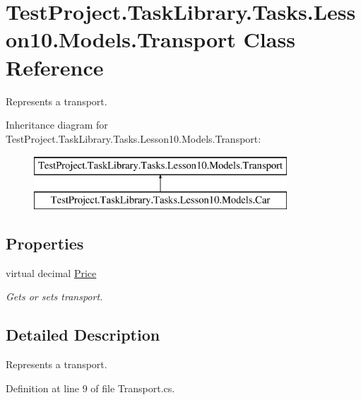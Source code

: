 \hypertarget{class_test_project_1_1_task_library_1_1_tasks_1_1_lesson10_1_1_models_1_1_transport}{}\section{Test\+Project.\+Task\+Library.\+Tasks.\+Lesson10.\+Models.\+Transport Class Reference}
\label{class_test_project_1_1_task_library_1_1_tasks_1_1_lesson10_1_1_models_1_1_transport}


Represents a transport.  


Inheritance diagram for Test\+Project.\+Task\+Library.\+Tasks.\+Lesson10.\+Models.\+Transport\+:\begin{figure}[H]
\begin{center}
\leavevmode
\includegraphics[height=2.000000cm]{class_test_project_1_1_task_library_1_1_tasks_1_1_lesson10_1_1_models_1_1_transport}
\end{center}
\end{figure}
\subsection*{Properties}
\begin{DoxyCompactItemize}
\item 
virtual decimal \mbox{\hyperlink{class_test_project_1_1_task_library_1_1_tasks_1_1_lesson10_1_1_models_1_1_transport_acd90158ed26c0010d5a895d20223e20f}{Price}}
\begin{DoxyCompactList}\small\item\em Gets or sets transport. \end{DoxyCompactList}\end{DoxyCompactItemize}


\subsection{Detailed Description}
Represents a transport. 



Definition at line 9 of file Transport.\+cs.



